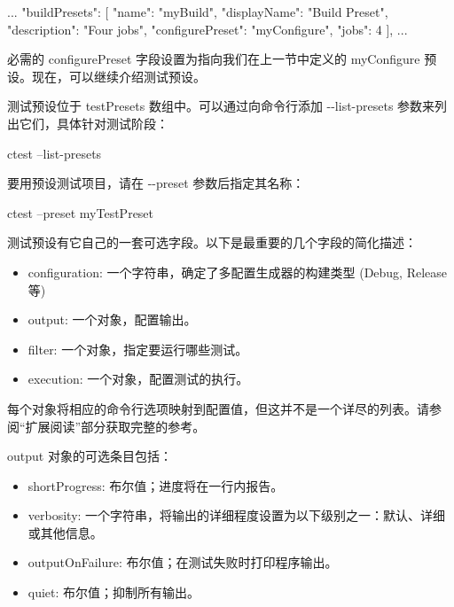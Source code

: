 \begin{json}
...
    "buildPresets": [
        {
            "name": "myBuild",
            "displayName": "Build Preset",
            "description": "Four jobs",
            "configurePreset": "myConfigure",
            "jobs": 4
        }
    ],
...
\end{json}

必需的 configurePreset 字段设置为指向我们在上一节中定义的 myConfigure 预设。现在，可以继续介绍测试预设。


测试预设位于 testPresets 数组中。可以通过向命令行添加 -{}-list-presets 参数来列出它们，具体针对测试阶段：

\begin{shell}
ctest --list-presets
\end{shell}

要用预设测试项目，请在 -{}-preset 参数后指定其名称：

\begin{shell}
ctest --preset myTestPreset
\end{shell}

测试预设有它自己的一套可选字段。以下是最重要的几个字段的简化描述：

\begin{itemize}
\item
configuration: 一个字符串，确定了多配置生成器的构建类型 (Debug, Release等)

\item
output: 一个对象，配置输出。

\item
filter: 一个对象，指定要运行哪些测试。

\item
execution: 一个对象，配置测试的执行。
\end{itemize}

每个对象将相应的命令行选项映射到配置值，但这并不是一个详尽的列表。请参阅“扩展阅读”部分获取完整的参考。

output 对象的可选条目包括：

\begin{itemize}
\item
shortProgress: 布尔值；进度将在一行内报告。

\item
verbosity:  一个字符串，将输出的详细程度设置为以下级别之一：默认、详细或其他信息。

\item
outputOnFailure: 布尔值；在测试失败时打印程序输出。

\item
quiet: 布尔值；抑制所有输出。
\end{itemize}

